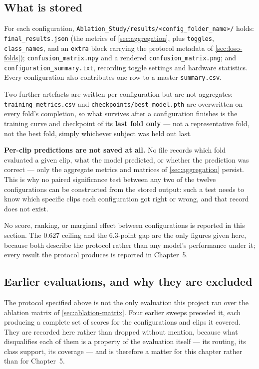 \subsection{What is stored}
\label{sec:what-is-stored}

For each configuration, \texttt{Ablation\_Study/results/<config\_folder\_name>/} holds: \texttt{final\_results.json} (the metrics of \autoref{sec:aggregation}, plus \texttt{toggles}, \texttt{class\_names}, and an \texttt{extra} block carrying the protocol metadata of \autoref{sec:loso-folds}); \texttt{confusion\_matrix.npy} and a rendered \texttt{confusion\_matrix.png}; and \texttt{configuration\_summary.txt}, recording toggle settings and hardware statistics. Every configuration also contributes one row to a master \texttt{summary.csv}.

Two further artefacts are written per configuration but are not aggregates: \texttt{training\_metrics.csv} and \texttt{checkpoints/best\_model.pth} are overwritten on every fold's completion, so what survives after a configuration finishes is the training curve and checkpoint of its \textbf{last fold only} --- not a representative fold, not the best fold, simply whichever subject was held out last.

\textbf{Per-clip predictions are not saved at all.} No file records which fold evaluated a given clip, what the model predicted, or whether the prediction was correct --- only the aggregate metrics and matrices of \autoref{sec:aggregation} persist. This is why no paired significance test between any two of the twelve configurations can be constructed from the stored output: such a test needs to know which specific clips each configuration got right or wrong, and that record does not exist.

No score, ranking, or marginal effect between configurations is reported in this section. The 0.627 ceiling and the 6.3-point gap are the only figures given here, because both describe the protocol rather than any model's performance under it; every result the protocol produces is reported in Chapter~5.

\subsection{Earlier evaluations, and why they are excluded}
\label{sec:excluded-evaluations}

The protocol specified above is not the only evaluation this project ran over the ablation matrix of \autoref{sec:ablation-matrix}. Four earlier sweeps preceded it, each producing a complete set of scores for the configurations and clips it covered. They are recorded here rather than dropped without mention, because what disqualifies each of them is a property of the evaluation itself --- its routing, its class support, its coverage --- and is therefore a matter for this chapter rather than for Chapter~5.

